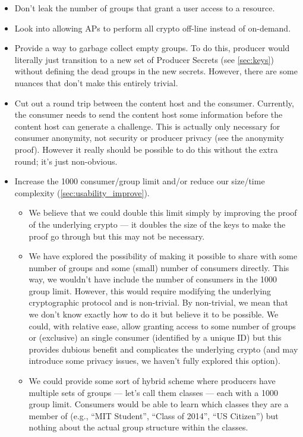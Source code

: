 \documentclass[pdftex,12pt,a4papaer,twoside,notitlepage]{report}
\begin{document}
\begin{itemize}
\item Don't leak the number of groups that grant a user access to a resource.
\item Look into allowing APs to perform all crypto off-line instead of
  on-demand.
\item Provide a way to garbage collect empty groups. To do this, producer would
  literally just transition to a new set of Producer Secrets (see
  \cref{sec:keys}) without defining the dead groups in the new secrets. However,
  there are some nuances that don't make this entirely trivial.
\item Cut out a round trip between the content host and the consumer. Currently,
  the consumer needs to send the content host some information before the
  content host can generate a challenge. This is actually only necessary for
  consumer anonymity, not security or producer privacy (see the anonymity
  proof). However it really should be possible to do this without the extra
  round; it's just non-obvious.
\item Increase the 1000 consumer/group limit and/or reduce our size/time complexity (\cref{sec:usability_improve}).
  \begin{itemize} 
  \item We believe that we could double this limit simply by improving the proof
    of the underlying crypto --- it doubles the size of the keys to make the
    proof go through but this may not be necessary.
  \item We have explored the possibility of making it possible to share with
    some number of groups and some (small) number of consumers directly. This
    way, we wouldn't have include the number of consumers in the 1000 group
    limit. However, this would require modifying the underlying cryptographic
    protocol and is non-trivial. By non-trivial, we mean that we don't know
    exactly how to do it but believe it to be possible. We could, with relative
    ease, allow granting access to some number of groups or (exclusive) an
    single consumer (identified by a unique ID) but this provides dubious
    benefit and complicates the underlying crypto (and may introduce some
    privacy issues, we haven't fully explored this option).
  \item We could provide some sort of hybrid scheme where producers have
    multiple sets of groups --- let's call them classes --- each with a 1000
    group limit. Consumers would be able to learn which classes they are a
    member of (e.g., ``MIT Student'', ``Class of 2014'', ``US Citizen'') but
    nothing about the actual group structure within the classes.
  \end{itemize}
\end{itemize}
\end{document}
